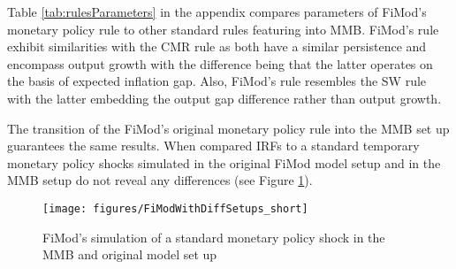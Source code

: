 \documentclass{article}
\begin{document}
Table \ref{tab:rulesParameters} in the appendix compares parameters
of FiMod's monetary policy rule to other standard rules featuring
into MMB. FiMod's rule exhibit similarities with the CMR rule as both
have a similar persistence and encompass output growth with the difference
being that the latter operates on the basis of expected inflation
gap. Also, FiMod's rule resembles the SW rule with the latter embedding
the output gap difference rather than output growth.

The transition of the FiMod's original monetary policy rule into the
MMB set up guarantees the same results. When compared IRFs to a standard
temporary monetary policy shocks simulated in the original FiMod model
setup and in the MMB setup do not reveal any differences (see Figure
\ref{fig:FiModWithDiffSetups}).

\begin{figure}[H]
\begin{centering}
\caption{FiMod's simulation of a standard monetary policy shock in the MMB
and original model set up \label{fig:FiModWithDiffSetups}}
\par\end{centering}
\begin{centering}
\texttt{[image: figures/FiModWithDiffSetups\_short]}
\par\end{centering}
\end{figure}
\end{document}
